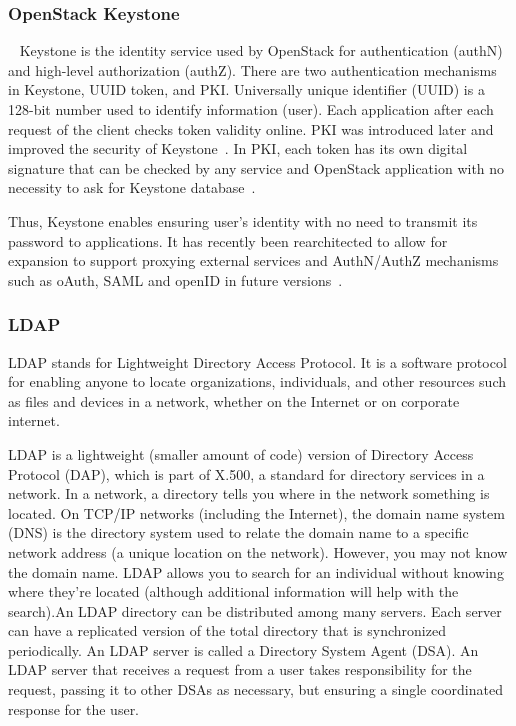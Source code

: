 \subsubsection{OpenStack Keystone \cv}
~\cite{www-keystone-wiki} Keystone is the identity service used by
OpenStack for authentication (authN) and high-level authorization
(authZ).  There are two authentication mechanisms in Keystone, UUID
token, and PKI.  Universally unique identifier (UUID) is a 128-bit
number used to identify information (user). Each
application after each request of the client checks token validity
online. PKI was introduced later and improved the security of
Keystone~\cite{cui2015security}. In PKI, each token has its
own digital signature that can be checked by any service and OpenStack
application with no necessity to ask for Keystone
database~\cite{www-cloudberrylab-kstn}.
 
Thus, Keystone enables ensuring user's identity with no need to
transmit its password to applications. It has recently been
rearchitected to allow for expansion to support proxying external
services and AuthN/AuthZ mechanisms such as oAuth, SAML and openID in
future versions~\cite{www-keystone}.

\subsubsection{LDAP}

LDAP stands for Lightweight Directory Access Protocol. It is a
software protocol for enabling anyone to locate organizations,
individuals, and other resources such as files and devices in a
network, whether on the Internet or on corporate
internet.~\cite{www-ldap}

     LDAP is a lightweight (smaller amount of code) version of
     Directory Access Protocol (DAP), which is part of X.500, a
     standard for directory services in a network.  In a network, a
     directory tells you where in the network something is located. On
     TCP/IP networks (including the Internet), the domain name system
     (DNS) is the directory system used to relate the domain name to a
     specific network address (a unique location on the
     network). However, you may not know the domain name. LDAP allows
     you to search for an individual without knowing where they're
     located (although additional information will help with the
     search).An LDAP directory can be distributed among many
     servers. Each server can have a replicated version of the total
     directory that is synchronized periodically.  An LDAP server is
     called a Directory System Agent (DSA). An LDAP server that
     receives a request from a user takes responsibility for the
     request, passing it to other DSAs as necessary, but ensuring a
     single coordinated response for the user.

